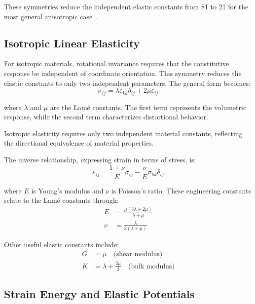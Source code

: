 These symmetries reduce the independent elastic constants from 81 to 21 for the most general anisotropic case~\autocite{Sadd.2019}.

\subsection{Isotropic Linear Elasticity}

For isotropic materials, rotational invariance requires that the constitutive response be independent of coordinate orientation. This symmetry reduces the elastic constants to only two independent parameters. The general form becomes:
\begin{equation}
\sigma_{ij} = \lambda \varepsilon_{kk} \delta_{ij} + 2\mu \varepsilon_{ij}
\end{equation}

where $\lambda$ and $\mu$ are the Lamé constants. The first term represents the volumetric response, while the second term characterizes distortional behavior.

\begin{keypoint}
Isotropic elasticity requires only two independent material constants, reflecting the directional equivalence of material properties.
\end{keypoint}

The inverse relationship, expressing strain in terms of stress, is:
\begin{equation}
\varepsilon_{ij} = \frac{1+\nu}{E}\sigma_{ij} - \frac{\nu}{E}\sigma_{kk}\delta_{ij}
\end{equation}

where $E$ is Young's modulus and $\nu$ is Poisson's ratio. These engineering constants relate to the Lamé constants through:
\begin{align}
E &= \frac{\mu(3\lambda + 2\mu)}{\lambda + \mu}\\
\nu &= \frac{\lambda}{2(\lambda + \mu)}
\end{align}

Other useful elastic constants include:
\begin{align}
G &= \mu \quad \text{(shear modulus)}\\
K &= \lambda + \frac{2\mu}{3} \quad \text{(bulk modulus)}
\end{align}

\subsection{Strain Energy and Elastic Potentials}

